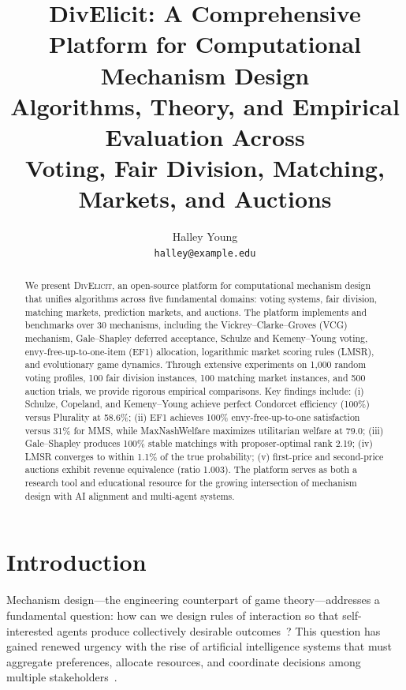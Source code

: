 \documentclass[10pt]{article}
\title{\textbf{DivElicit: A Comprehensive Platform for Computational Mechanism Design}\\[0.5em]
\large Algorithms, Theory, and Empirical Evaluation Across\\Voting, Fair Division, Matching, Markets, and Auctions}
\author{
  Halley Young\\
  \texttt{halley@example.edu}
}
\date{}
\begin{document}
\maketitle

\begin{abstract}
We present \textsc{DivElicit}, an open-source platform for computational mechanism design that unifies algorithms across five fundamental domains: voting systems, fair division, matching markets, prediction markets, and auctions. The platform implements and benchmarks over 30 mechanisms, including the Vickrey--Clarke--Groves (VCG) mechanism, Gale--Shapley deferred acceptance, Schulze and Kemeny--Young voting, envy-free-up-to-one-item (EF1) allocation, logarithmic market scoring rules (LMSR), and evolutionary game dynamics. Through extensive experiments on 1{,}000 random voting profiles, 100 fair division instances, 100 matching market instances, and 500 auction trials, we provide rigorous empirical comparisons. Key findings include: (i) Schulze, Copeland, and Kemeny--Young achieve perfect Condorcet efficiency (100\%) versus Plurality at 58.6\%; (ii) EF1 achieves 100\% envy-free-up-to-one satisfaction versus 31\% for MMS, while MaxNashWelfare maximizes utilitarian welfare at 79.0; (iii) Gale--Shapley produces 100\% stable matchings with proposer-optimal rank 2.19; (iv) LMSR converges to within 1.1\% of the true probability; (v) first-price and second-price auctions exhibit revenue equivalence (ratio 1.003). The platform serves as both a research tool and educational resource for the growing intersection of mechanism design with AI alignment and multi-agent systems.
\end{abstract}

\section{Introduction}
\label{sec:intro}

Mechanism design---the engineering counterpart of game theory---addresses a fundamental question: how can we design rules of interaction so that self-interested agents produce collectively desirable outcomes~\citep{hurwicz1972informationally, myerson1981optimal}? This question has gained renewed urgency with the rise of artificial intelligence systems that must aggregate preferences, allocate resources, and coordinate decisions among multiple stakeholders~\citep{conitzer2024social, procaccia2013cake}.
\end{document}
